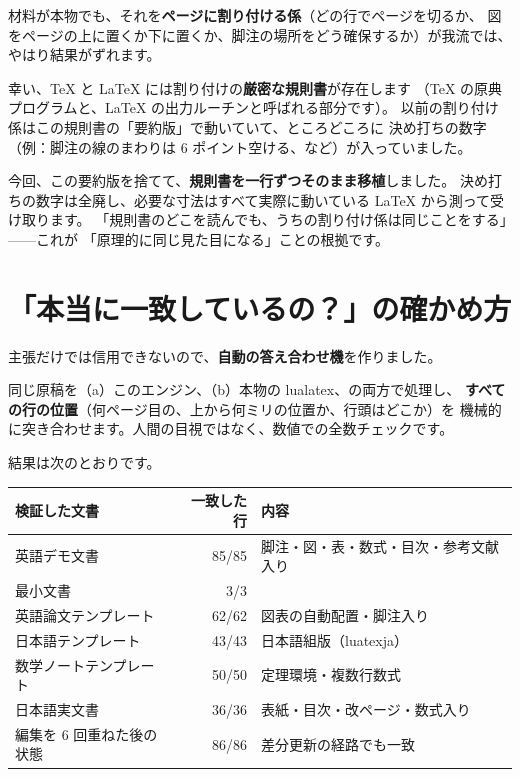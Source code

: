 \documentclass[11pt,a4paper]{ltjsarticle}
\begin{document}
材料が本物でも、それを\textbf{ページに割り付ける係}（どの行でページを切るか、
図をページの上に置くか下に置くか、脚注の場所をどう確保するか）が我流では、
やはり結果がずれます。

幸い、TeX と LaTeX には割り付けの\textbf{厳密な規則書}が存在します
（TeX の原典プログラムと、LaTeX の出力ルーチンと呼ばれる部分です）。
以前の割り付け係はこの規則書の「要約版」で動いていて、ところどころに
決め打ちの数字（例：脚注の線のまわりは 6 ポイント空ける、など）が入っていました。

今回、この要約版を捨てて、\textbf{規則書を一行ずつそのまま移植}しました。
決め打ちの数字は全廃し、必要な寸法はすべて実際に動いている LaTeX から測って受け取ります。
「規則書のどこを読んでも、うちの割り付け係は同じことをする」——これが
「原理的に同じ見た目になる」ことの根拠です。

\section{「本当に一致しているの？」の確かめ方}

主張だけでは信用できないので、\textbf{自動の答え合わせ機}を作りました。

同じ原稿を（a）このエンジン、（b）本物の lualatex、の両方で処理し、
\textbf{すべての行の位置}（何ページ目の、上から何ミリの位置か、行頭はどこか）を
機械的に突き合わせます。人間の目視ではなく、数値での全数チェックです。

結果は次のとおりです。

\begin{center}
\begin{tabular}{lrl}
\toprule
検証した文書 & 一致した行 & 内容 \\
\midrule
英語デモ文書 & 85/85 & 脚注・図・表・数式・目次・参考文献入り \\
最小文書 & 3/3 & \\
英語論文テンプレート & 62/62 & 図表の自動配置・脚注入り \\
日本語テンプレート & 43/43 & 日本語組版（luatexja） \\
数学ノートテンプレート & 50/50 & 定理環境・複数行数式 \\
日本語実文書 & 36/36 & 表紙・目次・改ページ・数式入り \\
\midrule
編集を 6 回重ねた後の状態 & 86/86 & 差分更新の経路でも一致 \\
\bottomrule
\end{tabular}
\end{center}
\end{document}
